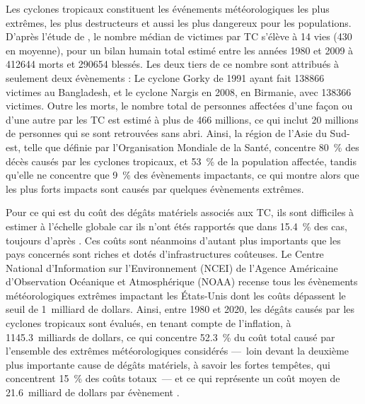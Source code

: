 \documentclass[../main.tex]{subfiles}
\begin{document}
Les cyclones tropicaux constituent les événements météorologiques les plus extrêmes, les plus destructeurs et aussi les plus dangereux pour les populations. D'après l'étude de \cite{doocy_human_2013}, le nombre médian de victimes par TC s'élève à \num{14} vies (\num{430} en moyenne), pour un bilan humain total estimé entre les années 1980 et 2009 à \num{412644} morts et \num{290654} blessés. Les deux tiers de ce nombre sont attribués à seulement deux évènements : Le cyclone Gorky de 1991 ayant fait \num{138866} victimes au Bangladesh, et le cyclone Nargis en 2008, en
Birmanie, avec \num{138366} victimes. Outre les morts, le nombre total de personnes affectées d'une façon ou d'une autre par les TC est estimé à plus de \num{466} millions, ce qui inclut \num{20} millions de personnes qui se sont retrouvées sans abri. Ainsi, la région de l'Asie du Sud-est, telle que définie par l'Organisation Mondiale de la Santé, concentre \SI{80}{\percent} des décès causés par les cyclones tropicaux, et \SI{53}{\percent} de la population affectée, tandis qu'elle ne
concentre que \SI{9}{\percent} des évènements impactants, ce qui montre alors que les plus forts impacts sont causés par quelques évènements extrêmes.

Pour ce qui est du coût des dégâts matériels associés aux TC, ils sont difficiles à estimer à l'échelle globale car ils n'ont étés rapportés que dans \SI{15.4}{\percent} des cas, toujours d'après \cite{doocy_human_2013}. Ces coûts sont néanmoins d'autant plus importants que les pays concernés sont riches et dotés d'infrastructures coûteuses. Le Centre National d'Information sur l'Environnement (NCEI) de l'Agence Américaine d'Observation Océanique et Atmosphérique (NOAA) recense tous les
évènements météorologiques extrêmes impactant les États-Unis dont les coûts dépassent le seuil de \num{1}~milliard de dollars. Ainsi, entre 1980 et 2020, les dégâts causés par les cyclones tropicaux sont évalués, en tenant compte de l'inflation, à \num{1145.3}~milliards de dollars, ce qui concentre \SI{52.3}{\percent} du coût total causé par l'ensemble des extrêmes météorologiques considérés ---~loin devant la deuxième plus importante cause de dégâts matériels, à savoir les fortes tempêtes, qui
concentrent \SI{15}{\percent} des coûts totaux~--- et ce qui représente un coût moyen de \num{21.6}~milliard de dollars par évènement
\parencite{smith_billiondollar_2020}.
\end{document}

